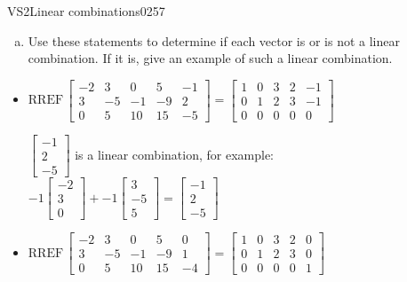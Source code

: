 \begin{exercise}{VS2}{Linear combinations}{0257}
\begin{exerciseStatement}
\begin{enumerate}[(a)]
\begin{itemize}
 
\end{itemize}

     
\item  

 Use these statements to determine if each vector is or is not a linear combination. If it is, give an example of such a linear combination. 

 
\end{enumerate}

     \end{exerciseStatement}
 \begin{exerciseAnswer} 

\begin{itemize}
\item  

 \(
\mathrm{RREF}\, \left[\begin{array}{cccc|c}
-2 & 3 & 0 & 5 & -1 \\
3 & -5 & -1 & -9 & 2 \\
0 & 5 & 10 & 15 & -5
\end{array}\right] = \left[\begin{array}{cccc|c}
1 & 0 & 3 & 2 & -1 \\
0 & 1 & 2 & 3 & -1 \\
0 & 0 & 0 & 0 & 0
\end{array}\right]
                        \) 

 

 \(\left[\begin{array}{c}
-1 \\
2 \\
-5
\end{array}\right]\) is a linear combination, for example: \(
-1 \left[\begin{array}{c}
-2 \\
3 \\
0
\end{array}\right] + -1 \left[\begin{array}{c}
3 \\
-5 \\
5
\end{array}\right] = \left[\begin{array}{c}
-1 \\
2 \\
-5
\end{array}\right]
                            \) 

 
\item  

 \(
\mathrm{RREF}\, \left[\begin{array}{cccc|c}
-2 & 3 & 0 & 5 & 0 \\
3 & -5 & -1 & -9 & 1 \\
0 & 5 & 10 & 15 & -4
\end{array}\right] = \left[\begin{array}{cccc|c}
1 & 0 & 3 & 2 & 0 \\
0 & 1 & 2 & 3 & 0 \\
0 & 0 & 0 & 0 & 1
\end{array}\right]
                        \) 


\end{itemize}
\end{exerciseAnswer}
\end{exercise}
